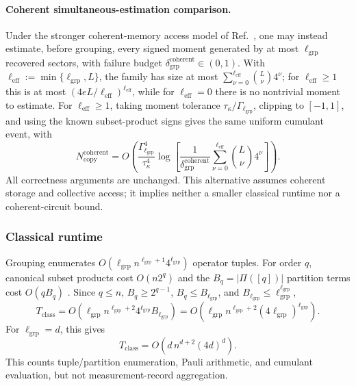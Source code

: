 \documentclass[
  aps,
  prx,
  reprint,
  superscriptaddress,
  amsmath,
  amssymb,
  nofootinbib,
  longbibliography
]{revtex4-2}
\begin{document}
\paragraph{Coherent simultaneous-estimation comparison.}
Under the stronger coherent-memory access model of
Ref.~\cite{HuangKuengPreskill2021}, one may instead estimate, before
grouping, every signed moment generated by at most
$\ell_{\mathrm{grp}}$ recovered sectors, with failure budget
$\delta_{\mathrm{grp}}^{\mathrm{coherent}}\in(0,1)$.  With
$\ell_{\mathrm{eff}}:=\min\{\ell_{\mathrm{grp}},L\}$, the family has size at
most
$\sum_{\nu=0}^{\ell_{\mathrm{eff}}}\binom L\nu4^\nu$; for
$\ell_{\mathrm{eff}}\ge1$ this is at most
$(4eL/\ell_{\mathrm{eff}})^{\ell_{\mathrm{eff}}}$, while for
$\ell_{\mathrm{eff}}=0$ there is no nontrivial moment to estimate.
For $\ell_{\mathrm{eff}}\ge1$, taking moment tolerance
$\tau_\kappa/\Gamma_{\ell_{\mathrm{grp}}}$, clipping to $[-1,1]$, and using
the known subset-product signs gives the same uniform cumulant event, with
\begin{equation}
N_{\mathrm{copy}}^{\mathrm{coherent}}
=
O\!\left(
\frac{\Gamma_{\ell_{\mathrm{grp}}}^4}{\tau_\kappa^4}
\log\!\left[
\frac{1}{\delta_{\mathrm{grp}}^{\mathrm{coherent}}}
\sum_{\nu=0}^{\ell_{\mathrm{eff}}}\binom L\nu4^\nu
\right]
\right).
\label{eq:supp-coherent-grouping-generic-copies}
\end{equation}
All correctness arguments are unchanged.  This alternative assumes coherent
storage and collective access; it implies neither a smaller classical runtime
nor a coherent-circuit bound.

\subsubsection{Classical runtime}

Grouping enumerates
$O(\ell_{\mathrm{grp}}n^{\ell_{\mathrm{grp}}+1}4^{\ell_{\mathrm{grp}}})$
operator tuples.  For order $q$, canonical subset products cost $O(n2^q)$
and the $B_q=|\Pi([q])|$ partition terms cost $O(qB_q)$
\cite{smith2020multivariateKstatistics}.  Since $q\le n$,
$B_q\ge2^{q-1}$, $B_q\le B_{\ell_{\mathrm{grp}}}$, and
$B_{\ell_{\mathrm{grp}}}\le
\ell_{\mathrm{grp}}^{\ell_{\mathrm{grp}}}$,
\begin{equation}
T_{\mathrm{class}}
=
O\!\left(
\ell_{\mathrm{grp}}n^{\ell_{\mathrm{grp}}+2}
4^{\ell_{\mathrm{grp}}}B_{\ell_{\mathrm{grp}}}
\right)
=
O\!\left(
\ell_{\mathrm{grp}}n^{\ell_{\mathrm{grp}}+2}
(4\ell_{\mathrm{grp}})^{\ell_{\mathrm{grp}}}
\right).
\end{equation}
For $\ell_{\mathrm{grp}}=d$, this gives
\begin{equation}
T_{\mathrm{class}}
=
O\!\left(
d\,n^{d+2}(4d)^d
\right).
\label{eq:supp-runtime-emp-cumulant-asymptotic}
\end{equation}
This counts tuple/partition enumeration, Pauli arithmetic, and cumulant
evaluation, but not measurement-record aggregation.
\end{document}
